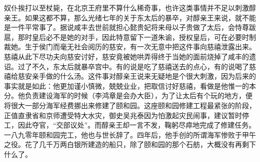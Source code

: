   奴仆挨打以至杖毙，在北京王府里不算什么稀奇事，也许这类事情并不足以刺激醇亲王。如果这都不算，那么光绪七年的关于东太后的暴卒，对醇亲王来说，就不能是一件平常事了。据说咸丰去世前就担心懿贵妃将来母以子贵做了太后，会恃尊跋扈，那时皇后必不是她的对手，因此特意留下一道朱谕，授权皇后，可在必要时制裁她。生于侯门而毫无社会阅历的慈安，有一次无意中把这件事向慈禧泄露出来。慈禧从此下尽功夫向慈安讨好，慈安竟被她哄弄得终于当她的面前烧掉了咸丰的遗诏。过了不久，东太后就暴卒宫中。有的说是吃了慈禧送去的点心，有的说喝了慈禧给慈安亲手做的什么汤。这件事对醇亲王说来无疑地是个很大刺激，因为后来的事实就是如此：他更加谨小慎微，兢兢业业，把取信讨好慈禧，看做是他惟一的本分。他负责建设海军的时候（李鸿章是会办大臣），为了让太后有个玩的地方，便将很大一部分海军经费挪出来修建了颐和园。这座颐和园修建工程最紧张的阶段，正值直隶省和京师遭受特大水灾，御史吴兆泰因为怕激起灾民闹事，建议暂时停工，因此夺官，“交部议处”。而醇亲王却一言不发，鞠躬尽瘁地完成了修建任务。一八九零年颐和园完工，他也与世长辞了。四年后，他手创的所谓海军惨败于甲午之役。花了几千万两白银所建造的船只，除了颐和园的那个石舫，大概没有再剩下什么了。\\
